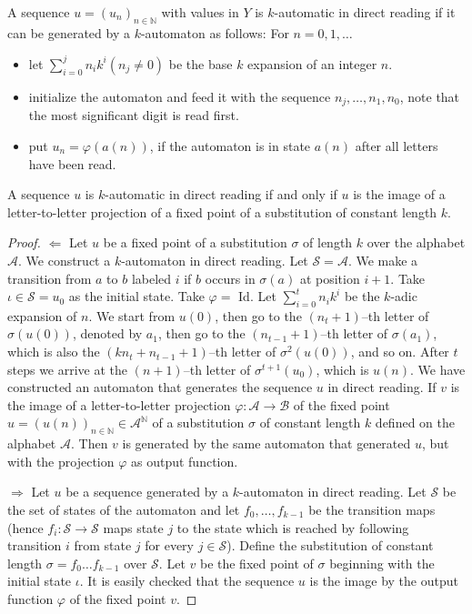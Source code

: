 \documentclass{article}
\begin{document}
\begin{definition} \label{def:direct_reading}
A sequence $u = (u_n)_{n \in \mathbb{N}}$ with values in $Y$ is $k$-automatic 
in direct reading if it can be generated by a $k$-automaton as follows: For 
$n = 0, 1, \ldots$
\begin{itemize}
\item let $\sum_{i=0}^j n_i k^i (n_j \neq 0)$ be the base $k$ expansion of an
      integer $n$.
\item initialize the automaton and feed it with the sequence 
      $n_j, \ldots, n_ 1, n_0$, note that the most significant digit is read 
      first.
\item put $u_n = \varphi(a(n))$, if the automaton is in state $a(n)$ after all
      letters have been read.
\end{itemize}
\end{definition}

\begin{theorem} \label{thm:direct_reading}
A sequence $u$ is $k$-automatic in direct reading if and only if $u$ is the 
image of a letter-to-letter projection of a fixed point of a substitution of 
constant length $k$.
\end{theorem} 

\begin{proof}
$\Leftarrow$ Let $u$ be a fixed point of a substitution $\sigma$ of length
$k$ over the alphabet $\mathcal{A}$. We construct a $k$-automaton in direct 
reading. Let $\mathcal{S = A}$. We make a transition from $a$ to $b$ labeled 
$i$ if $b$ occurs in $\sigma(a)$ at position $i + 1$. Take 
$\iota \in \mathcal{S} = u_0$ as the initial state. Take $\varphi =$ Id.
Let $\sum_{i = 0}^t n_i k^i$ be the $k$-adic expansion of $n$. We start from 
$u(0)$, then go to the $(n_t + 1)$--th letter of $\sigma(u(0))$, denoted by 
$a_1$, then go to the $(n_{t - 1} + 1)$--th letter of $\sigma(a_1)$, which is 
also the $(kn_t + n_{t - 1} + 1)$--th letter of $\sigma^2(u(0))$, and so on.
After $t$ steps we arrive at the $(n + 1)$--th letter of 
$\sigma^{t + 1}(u_0)$, which is $u(n)$. We have constructed an automaton that 
generates the sequence $u$ in direct reading. If $v$ is the image of a 
letter-to-letter projection $\varphi: \mathcal{A} \to \mathcal{B}$ of the 
fixed point $u = (u(n))_{n \in \mathbb{N}} \in \mathcal{A}^\mathbb{N}$ of a 
substitution $\sigma$ of constant length $k$ defined on the alphabet 
$\mathcal{A}$. Then $v$ is generated by the same automaton that generated $u$, 
but with the projection $\varphi$ as output function.

$\Rightarrow$ Let $u$ be a sequence generated by a $k$-automaton in direct
reading. Let $\mathcal{S}$ be the set of states of the automaton and let
$f_0, \ldots, f_{k - 1}$ be the transition maps (hence 
$f_i: \mathcal{S \to S}$ maps state $j$ to the state which is reached by 
following transition $i$ from state $j$ for every $j \in \mathcal{S}$). Define 
the substitution of constant length $\sigma = f_0 \dots f_{k - 1}$ over 
$\mathcal{S}$. Let $v$ be the fixed point of $\sigma$ beginning with the 
initial state $\iota$. It is easily checked that the sequence $u$ is the image 
by the output function $\varphi$ of the fixed point $v$. 
\end{proof}
\end{document}

